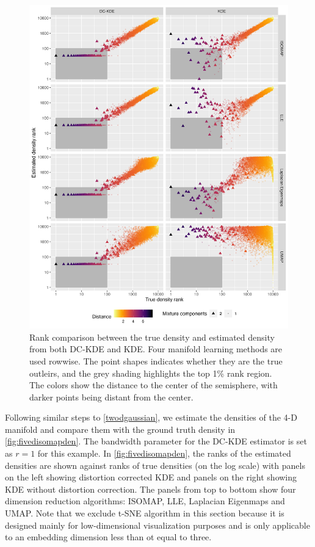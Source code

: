 \documentclass[11pt,a4paper,]{article}
\begin{document}
\begin{figure}

{\centering \includegraphics[width=0.95\linewidth]{figures/sim4d10000_density_comparison_4ml_radius10_k200_rankdensity_circleoutlier_with1rec} 

}

\caption{Rank comparison between the true density and estimated density from both DC-KDE and KDE. Four manifold learning methods are used rowwise. The point shapes indicates whether they are the true outleirs, and the grey shading highlights the top 1\% rank region. The colors show the distance to the center of the semisphere, with darker points being distant from the center.}\label{fig:fivedisomapden}
\end{figure}

Following similar steps to \autoref{twodgaussian}, we estimate the densities of the 4-D manifold and compare them with the ground truth density in \autoref{fig:fivedisomapden}. The bandwidth parameter for the DC-KDE estimator is set as \(r=1\) for this example. In \autoref{fig:fivedisomapden}, the ranks of the estimated densities are shown against ranks of true densities (on the log scale) with panels on the left showing distortion corrected KDE and panels on the right showing KDE without distortion correction. The panels from top to bottom show four dimension reduction algorithms: ISOMAP, LLE, Laplacian Eigenmaps and UMAP. Note that we exclude t-SNE algorithm in this section because it is designed mainly for low-dimensional visualization purposes and is only applicable to an embedding dimension less than ot equal to three.
\end{document}
